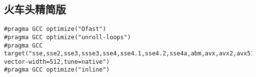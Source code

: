 \documentclass[a4paper,landscape,twocolumn]{ctexart}
\begin{document}

%

\subsection{火车头精简版}

\begin{lstlisting}[]
#pragma GCC optimize("Ofast")
#pragma GCC optimize("unroll-loops")
#pragma GCC target("sse,sse2,sse3,ssse3,sse4,sse4.1,sse4.2,sse4a,abm,avx,avx2,avx512f,prefer-vector-width=512,tune=native")
#pragma GCC optimize("inline")
\end{lstlisting}
\end{document}
